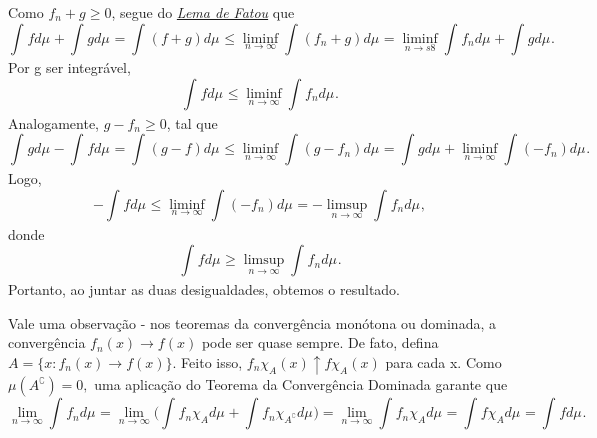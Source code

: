 \documentclass[MeasureTheory/measure_theory.tex]{subfiles}
\begin{document}
\begin{proof*}
	Como \(f_{n} +g \geq 0\), segue do \hyperlink{fatou}{\textit{Lema de Fatou}} que
	\[
		\int_{}f d\mu_{} + \int_{}g d\mu_{} = \int_{}(f+g) d\mu_{} \leq \liminf_{n\to \infty}\int_{}(f_{n}+g) d\mu_{} = \liminf_{n\to s8}\int_{}f_{n} d\mu_{} + \int_{}g d\mu_{}.
	\]
	Por g ser integrável,
	\[
		\int_{}f d\mu_{} \leq \liminf_{n\to \infty}\int_{}f_{n} d\mu_{}.
	\]
	Analogamente, \(g-f_{n}\geq 0\), tal que
	\[
		\int_{}g d\mu_{} - \int_{}f d\mu_{} = \int_{}(g-f) d\mu_{} \leq \liminf_{n\to \infty}\int_{}(g-f_{n}) d\mu_{} = \int_{}g d\mu_{} + \liminf_{n\to \infty}\int_{}(-f_{n}) d\mu_{}.
	\]
	Logo,
	\[
		-\int_{}f d\mu_{} \leq \liminf_{n\to \infty}\int_{}(-f_{n}) d\mu_{} = - \limsup_{n\to \infty}\int_{}f_{n} d\mu_{},
	\]
	donde
	\[
		\int_{}f d\mu_{} \geq \limsup_{n\to \infty}\int_{}f_{n} d\mu_{}.
	\]
	Portanto, ao juntar as duas desigualdades, obtemos o resultado. \qedsymbol
\end{proof*}
Vale uma observação - nos teoremas da convergência monótona ou dominada, a convergência \(f_{n}(x)\to f(x)\) pode ser quase sempre. De fato, defina \(A = \{x:f_{n}(x)\to f(x)\}.\) Feito isso,
\(f_{n}\chi_{A}(x)\uparrow f \chi_{A}(x)\) para cada x. Como \(\mu (A ^{\complement}) = 0, \) uma aplicação do \hypertarget{dominated_convergence}{Teorema da Convergência Dominada} garante que
\[
	\lim_{n\to \infty}\int_{}f_{n} d\mu_{} = \lim_{n\to \infty}\biggl(\int_{}f_{n} \chi_{A} d\mu_{} + \int_{}f_{n}\chi_{A ^{\complement}} d\mu_{}\biggr) = \lim_{n\to \infty}\int_{}f_{n}\chi_{A} d\mu_{} = \int_{}f \chi_{A} d\mu_{} = \int_{}f d\mu_{}.
\]
\end{document}
